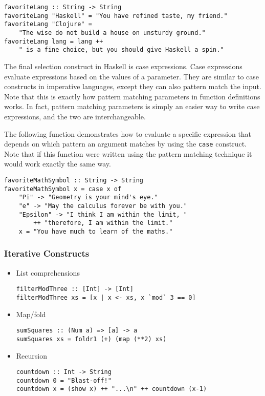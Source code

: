 \documentclass[titlepage,12pt]{article}
\newcommand{\bi}{\begin{itemize}}
\newcommand{\ei}{\end{itemize}}
\begin{document}
\begin{verbatim}
favoriteLang :: String -> String
favoriteLang "Haskell" = "You have refined taste, my friend."
favoriteLang "Clojure" = 
    "The wise do not build a house on unsturdy ground."
favoriteLang lang = lang ++ 
    " is a fine choice, but you should give Haskell a spin."
\end{verbatim}

The final selection construct in Haskell is case expressions. Case expressions evaluate expressions based on 
the values of a parameter. They are similar to case constructs in imperative languages, except they can also pattern 
match the input. Note that this is exactly how pattern matching parameters in function definitions works. In 
fact, pattern matching parameters is simply an easier way to write case expressions, and the two are interchangeable. 

The following function demonstrates how to evaluate a specific expression that depends on which pattern 
an argument matches by using the \texttt{case} construct. Note that if this function were written using the 
pattern matching technique it would work exactly the same way. 

\begin{verbatim}
favoriteMathSymbol :: String -> String
favoriteMathSymbol x = case x of
    "Pi" -> "Geometry is your mind's eye."
    "e" -> "May the calculus forever be with you."
    "Epsilon" -> "I think I am within the limit, "
        ++ "therefore, I am within the limit."
    x = "You have much to learn of the maths."
\end{verbatim}

\subsubsection{Iterative Constructs}
\bi
    \item List comprehensions
\begin{verbatim}
filterModThree :: [Int] -> [Int]
filterModThree xs = [x | x <- xs, x `mod` 3 == 0]
\end{verbatim}
    \item Map/fold
\begin{verbatim}
sumSquares :: (Num a) => [a] -> a
sumSquares xs = foldr1 (+) (map (**2) xs)
\end{verbatim}
    \item Recursion
\begin{verbatim}
countdown :: Int -> String
countdown 0 = "Blast-off!"
countdown x = (show x) ++ "...\n" ++ countdown (x-1)
\end{verbatim}
\ei
\end{document}
